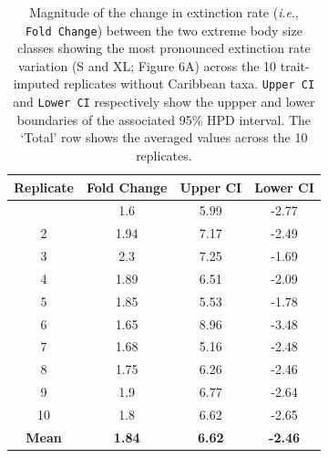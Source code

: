 \documentclass[
  9pt,
  letterpaper,
]{article}
\begin{document}
\begin{longtable}[]{@{}cccc@{}}

\caption{\label{tbl-FC_BM}Magnitude of the change in extinction rate
(\emph{i}.\emph{e}., \texttt{Fold\ Change}) between the two extreme body
size classes showing the most pronounced extinction rate variation (S
and XL; Figure 6A) across the 10 trait-imputed replicates without
Caribbean taxa. \texttt{Upper\ CI} and \texttt{Lower\ CI} respectively
show the uppper and lower boundaries of the associated 95\% HPD
interval. The `Total' row shows the averaged values across the 10
replicates.}

\tabularnewline

\toprule\noalign{}
Replicate & Fold Change & Upper CI & Lower CI \\
\midrule\noalign{}
\endhead
\bottomrule\noalign{}
\endlastfoot
1 & 1.6 & 5.99 & -2.77 \\
2 & 1.94 & 7.17 & -2.49 \\
3 & 2.3 & 7.25 & -1.69 \\
4 & 1.89 & 6.51 & -2.09 \\
5 & 1.85 & 5.53 & -1.78 \\
6 & 1.65 & 8.96 & -3.48 \\
7 & 1.68 & 5.16 & -2.48 \\
8 & 1.75 & 6.26 & -2.46 \\
9 & 1.9 & 6.77 & -2.64 \\
10 & 1.8 & 6.62 & -2.65 \\
\textbf{Mean} & \textbf{1.84} & \textbf{6.62} & \textbf{-2.46} \\

\end{longtable}
\end{document}

